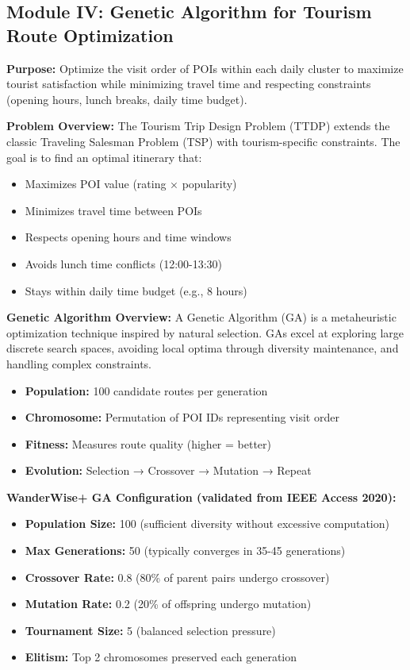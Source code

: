 \subsection{Module IV: Genetic Algorithm for Tourism Route Optimization}

\textbf{Purpose:} Optimize the visit order of POIs within each daily cluster to maximize tourist satisfaction while minimizing travel time and respecting constraints (opening hours, lunch breaks, daily time budget).

\textbf{Problem Overview:}
The Tourism Trip Design Problem (TTDP) extends the classic Traveling Salesman Problem (TSP) with tourism-specific constraints. The goal is to find an optimal itinerary that:
\begin{itemize}
\item Maximizes POI value (rating × popularity)
\item Minimizes travel time between POIs
\item Respects opening hours and time windows
\item Avoids lunch time conflicts (12:00-13:30)
\item Stays within daily time budget (e.g., 8 hours)
\end{itemize}

\textbf{Genetic Algorithm Overview:}
A Genetic Algorithm (GA) is a metaheuristic optimization technique inspired by natural selection. GAs excel at exploring large discrete search spaces, avoiding local optima through diversity maintenance, and handling complex constraints.
\begin{itemize}
\item \textbf{Population:} 100 candidate routes per generation
\item \textbf{Chromosome:} Permutation of POI IDs representing visit order
\item \textbf{Fitness:} Measures route quality (higher = better)
\item \textbf{Evolution:} Selection → Crossover → Mutation → Repeat
\end{itemize}

\textbf{WanderWise+ GA Configuration (validated from IEEE Access 2020):}
\begin{itemize}
\item \textbf{Population Size:} 100 (sufficient diversity without excessive computation)
\item \textbf{Max Generations:} 50 (typically converges in 35-45 generations)
\item \textbf{Crossover Rate:} 0.8 (80\% of parent pairs undergo crossover)
\item \textbf{Mutation Rate:} 0.2 (20\% of offspring undergo mutation)
\item \textbf{Tournament Size:} 5 (balanced selection pressure)
\item \textbf{Elitism:} Top 2 chromosomes preserved each generation
\end{itemize}

